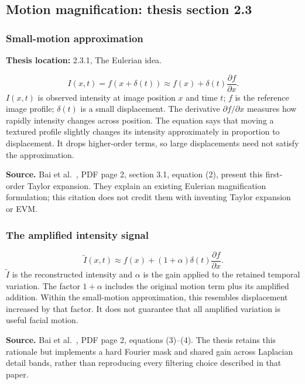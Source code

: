 \documentclass[11pt,a4paper]{article}
\numberwithin{equation}{section}
\begin{document}
\subsection{Motion magnification: thesis section 2.3}

\subsubsection{Small-motion approximation}
\label{fg:evm}
\textbf{Thesis location:} 2.3.1, The Eulerian idea.

\begin{equation}
    I(x,t)=f(x+\delta(t))
       \approx f(x)+\delta(t)\frac{\partial f}{\partial x}.
    \label{fg:eq:evm-taylor}
\end{equation}
$I(x,t)$ is observed intensity at image position $x$ and time $t$; $f$ is the
reference image profile; $\delta(t)$ is a small displacement. The derivative
$\partial f/\partial x$ measures how rapidly intensity changes across position.
The equation says that moving a textured profile slightly changes its intensity
approximately in proportion to displacement. It drops higher-order terms, so
large displacements need not satisfy the approximation.

\textbf{Source.} Bai et al.~\cite{bai2021}, PDF page 2, section 3.1,
equation (2), present this first-order Taylor expansion. They explain an existing
Eulerian magnification formulation; this citation does not credit them with
inventing Taylor expansion or EVM.

\subsubsection{The amplified intensity signal}
\begin{equation}
    \widetilde I(x,t)\approx
       f(x)+(1+\alpha)\delta(t)\frac{\partial f}{\partial x}.
    \label{fg:eq:evm-gain}
\end{equation}
$\widetilde I$ is the reconstructed intensity and $\alpha$ is the gain applied
to the retained temporal variation. The factor $1+\alpha$ includes the original
motion term plus its amplified addition. Within the small-motion approximation,
this resembles displacement increased by that factor. It does not guarantee
that all amplified variation is useful facial motion.

\textbf{Source.} Bai et al.~\cite{bai2021}, PDF page 2, equations (3)--(4).
The thesis retains this rationale but implements a hard Fourier mask and shared
gain across Laplacian detail bands, rather than reproducing every filtering
choice described in that paper.
\end{document}

